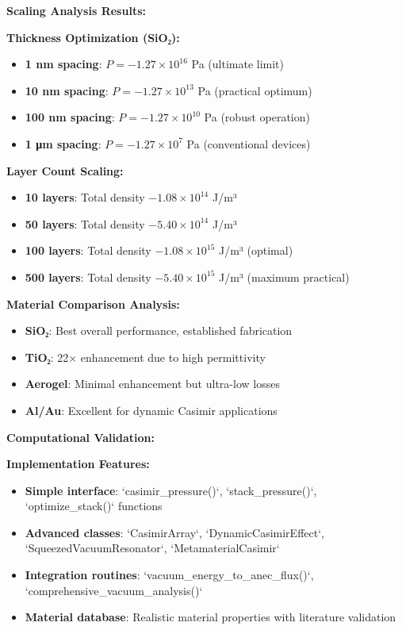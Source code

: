 \documentclass[11pt]{article}
\begin{document}
\textbf{Scaling Analysis Results:}

\textbf{Thickness Optimization (SiO₂):}
\begin{itemize}
    \item \textbf{1 nm spacing}: $P = -1.27 \times 10^{16}$ Pa (ultimate limit)
    \item \textbf{10 nm spacing}: $P = -1.27 \times 10^{13}$ Pa (practical optimum)
    \item \textbf{100 nm spacing}: $P = -1.27 \times 10^{10}$ Pa (robust operation)
    \item \textbf{1 μm spacing}: $P = -1.27 \times 10^7$ Pa (conventional devices)
\end{itemize}

\textbf{Layer Count Scaling:}
\begin{itemize}
    \item \textbf{10 layers}: Total density $-1.08 \times 10^{14}$ J/m³
    \item \textbf{50 layers}: Total density $-5.40 \times 10^{14}$ J/m³
    \item \textbf{100 layers}: Total density $-1.08 \times 10^{15}$ J/m³ (optimal)
    \item \textbf{500 layers}: Total density $-5.40 \times 10^{15}$ J/m³ (maximum practical)
\end{itemize}

\textbf{Material Comparison Analysis:}
\begin{itemize}
    \item \textbf{SiO₂}: Best overall performance, established fabrication
    \item \textbf{TiO₂}: 22× enhancement due to high permittivity
    \item \textbf{Aerogel}: Minimal enhancement but ultra-low losses
    \item \textbf{Al/Au}: Excellent for dynamic Casimir applications
\end{itemize}

\textbf{Computational Validation:}

\textbf{Implementation Features:}
\begin{itemize}
    \item \textbf{Simple interface}: `casimir_pressure()`, `stack_pressure()`, `optimize_stack()` functions
    \item \textbf{Advanced classes}: `CasimirArray`, `DynamicCasimirEffect`, `SqueezedVacuumResonator`, `MetamaterialCasimir`
    \item \textbf{Integration routines}: `vacuum_energy_to_anec_flux()`, `comprehensive_vacuum_analysis()`
    \item \textbf{Material database}: Realistic material properties with literature validation
\end{itemize}
\end{document}
